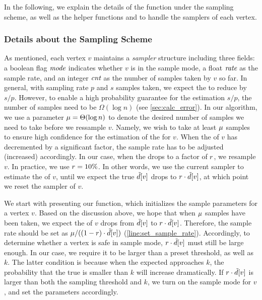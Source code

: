 In the following, we explain the details of the \FPeel{} function under the sampling scheme, as well as the helper functions \FInitSampler{} and \FSetSampler{} to handle the samplers of each vertex. 


\subsubsection{Details about the Sampling Scheme} 
\label{sec:sampling:details}

As mentioned, each vertex $v$ maintains a \emph{sampler} structure including three fields: a boolean flag $\text{\it mode}$ indicates whether $v$ is in the sample mode, a float $\text{\it rate}$ as the sample rate, and an integer $\text{\it cnt}$ as the number of samples taken by $v$ so far. 
In general, with sampling rate $p$ and $s$ samples taken, we expect the \induceddegree{} to reduce by $s/p$. 
However, to enable a high probability guarantee for the estimation $s/p$, the number of samples need to be $\Omega(\log n)$ (see \cref{sec:calc_error}). 
In our algorithm, we use a parameter $\mathit{\mu}=\Theta(\log n)$ to denote the desired number of samples we need to take before we ressample $v$. 
Namely, we wish to take at least $\mathit{\mu}$ samples to ensure high confidence for the estimation of the \induceddegree{} for $v$. 
When the \induceddegree{} of $v$ has decremented by a significant factor, 
the sample rate has to be adjusted (increased) accordingly. 
In our case, when the \induceddegree{} drops to a factor of $r$, we resample $v$. 
In practice, we use $r=10\%$. 
In other words, we use the current sampler to estimate the \induceddegree{} of $v$, 
until we expect the true $\tilde{d}[v]$ drops to $r\cdot \tilde{d}[v]$, at which point we reset the sampler of $v$. 

We start with presenting our \FInitSampler{} function, which initializes the sample parameters for a vertex $v$. 
Based on the discussion above, we hope that when $\mathit{\mu}$ samples have been taken, 
we expect the \induceddegree{} of $v$ drops from $\tilde{d}[v]$ to $r\cdot \tilde{d}[v]$. Therefore, the sample rate should be set as $\mathit{\mu}/((1-r)\cdot\tilde{d}[v])$ (\cref{line:set_sample_rate}). 
Accordingly, to determine whether a vertex is safe in sample mode, $r\cdot\tilde{d}[v]$ must still be large enough.
In our case, we require it to be larger than a preset threshold, as well as $k$. 
The latter condition is because when the expected \induceddegree{} approaches $k$, the probability that the true \induceddegree{} is smaller than $k$ will increase dramatically. 
If $r\cdot\tilde{d}[v]$ is larger than both the sampling threshold and $k$, 
we turn on the sample mode for $v$, and set the parameters accordingly. 

